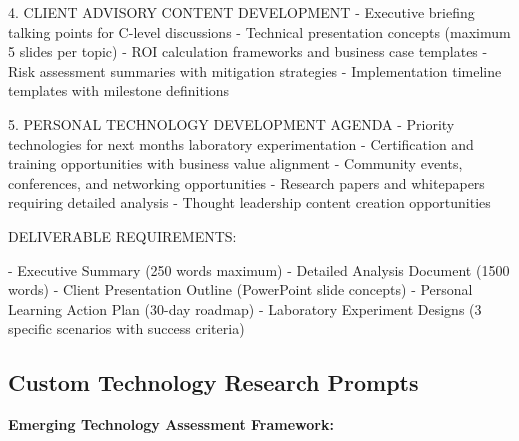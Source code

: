 \documentclass[
  letterpaper,
  DIV=11,
  numbers=noendperiod]{scrartcl}
\newenvironment{Shaded}{\begin{snugshade}}{\end{snugshade}}
\newcommand{\NormalTok}[1]{\textcolor[rgb]{0.00,0.23,0.31}{#1}}
\begin{document}
\begin{Shaded}
\begin{Highlighting}[]
\NormalTok{4. CLIENT ADVISORY CONTENT DEVELOPMENT}
\NormalTok{   {-} Executive briefing talking points for C{-}level discussions}
\NormalTok{   {-} Technical presentation concepts (maximum 5 slides per topic)}
\NormalTok{   {-} ROI calculation frameworks and business case templates}
\NormalTok{   {-} Risk assessment summaries with mitigation strategies}
\NormalTok{   {-} Implementation timeline templates with milestone definitions}

\NormalTok{5. PERSONAL TECHNOLOGY DEVELOPMENT AGENDA}
\NormalTok{   {-} Priority technologies for next month\textquotesingle{}s laboratory experimentation}
\NormalTok{   {-} Certification and training opportunities with business value alignment}
\NormalTok{   {-} Community events, conferences, and networking opportunities}
\NormalTok{   {-} Research papers and whitepapers requiring detailed analysis}
\NormalTok{   {-} Thought leadership content creation opportunities}

\NormalTok{DELIVERABLE REQUIREMENTS:}

\NormalTok{{-} Executive Summary (250 words maximum)}
\NormalTok{{-} Detailed Analysis Document (1500 words)}
\NormalTok{{-} Client Presentation Outline (PowerPoint slide concepts)}
\NormalTok{{-} Personal Learning Action Plan (30{-}day roadmap)}
\NormalTok{{-} Laboratory Experiment Designs (3 specific scenarios with success criteria)}
\end{Highlighting}
\end{Shaded}

\subsection{Custom Technology Research
Prompts}\label{custom-technology-research-prompts}

\textbf{Emerging Technology Assessment Framework:}
\end{document}

